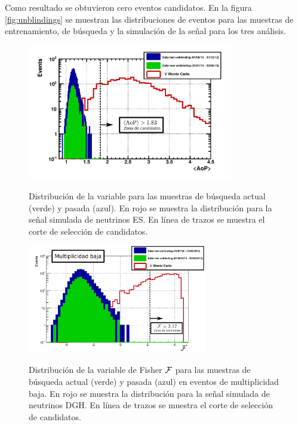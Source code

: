 	Como resultado se obtuvieron cero eventos candidatos.
	En la figura \ref{fig:unblindings} se muestran las distribuciones de eventos para las muestras de entrenamiento, de b\'usqueda y la simulaci\'on de la se\~nal para los tres an\'alisis. 
	
	
	\begin{figure}[ht!]
		\begin{center}
			\includegraphics[width=0.8\textwidth]{fig/resultadosAuger/Unblinding_ES_200613_mod}\\
			\caption{\label{fig:unblindingES}
			Distribuci\'on de la variable \aop{} para las muestras de b\'usqueda actual (verde) y pasada (azul). En rojo se muestra la distribuci\'on para la se\~nal simulada de neutrinos ES.
			En l\'inea de trazos se muestra el corte de selecci\'on de candidatos.
			}
		\end{center}
	\end{figure}
	
	\begin{figure}[ht!]
		\begin{center}
			\includegraphics[width=0.7\textwidth]{fig/resultadosAuger/DGH_Retrining_May2012_2_low_Nor_mod}\\
			\caption{\label{fig:unblindingDGHL}
			Distribuci\'on de la variable de Fisher $\cal F$ para las muestras de b\'usqueda actual (verde) y pasada (azul) en eventos de multiplicidad baja. En rojo se muestra la distribuci\'on para la se\~nal simulada de neutrinos DGH.
			En l\'inea de trazos se muestra el corte de selecci\'on de candidatos.
			}
		\end{center}
	\end{figure}
	
